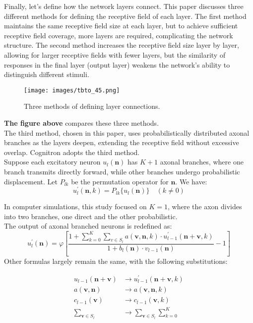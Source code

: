 \documentclass[11p,oneside]{book}
\begin{document}
Finally, let’s define how the network layers connect. This paper discusses three different methods for defining the receptive field of each layer. The first method maintains the same receptive field size at each layer, but to achieve sufficient receptive field coverage, more layers are required, complicating the network structure. The second method increases the receptive field size layer by layer, allowing for larger receptive fields with fewer layers, but the similarity of responses in the final layer (output layer) weakens the network’s ability to distinguish different stimuli.

\begin{figure}[H]
    \centering
    \texttt{[image: images/tbto\_45.png]}
    \caption{Three methods of defining layer connections.}
\end{figure}

\textbf{The figure above} compares these three methods. \\

The third method, chosen in this paper, uses probabilistically distributed axonal branches as the layers deepen, extending the receptive field without excessive overlap. Cognitron adopts the third method. \\

Suppose each excitatory neuron $u_l(\mathbf{n})$ has $K+1$ axonal branches, where one branch transmits directly forward, while other branches undergo probabilistic displacement. Let $P_{lk}$ be the permutation operator for $\mathbf{n}$. We have:
$$
u^{\prime}_l(\mathbf{n}, k) = P_{lk} \{ u_l(\mathbf{n}) \} \quad (k \neq 0)
$$

In computer simulations, this study focused on $K = 1$, where the axon divides into two branches, one direct and the other probabilistic. \\

The output of axonal branched neurons is redefined as:
$$
u^{\prime}_l(\mathbf{n}) = \varphi \left[ \frac{1 + \sum_{k=0}^{K} \sum_{v \in S_l} a(\mathbf{v, n}, k) \cdot u^{\prime}_{l-1}(\mathbf{n+v}, k)}{1 + b_l(\mathbf{n}) \cdot v_{l-1}(\mathbf{n})} - 1 \right]
$$
Other formulas largely remain the same, with the following substitutions:

\begin{align*}
u_{l-1}(\mathbf{n+v}) &\rightarrow u^{\prime}_{l-1}(\mathbf{n+v}, k) \\
a(\mathbf{v, n}) &\rightarrow a(\mathbf{v, n}, k) \\
c_{l-1}(\mathbf{v}) &\rightarrow c_{l-1}(\mathbf{v}, k) \\
\sum_{\mathbf{v} \in S_l} &\rightarrow \sum_{\mathbf{v} \in S_l} \sum_{k=0}^{K}
\end{align*}
\end{document}

